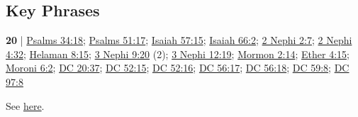 		
		
\subsection{Key Phrases} %
	\label{SPIRIT-PHRASES}

	\begin{compactdesc}
	
		\item[contrite spirit] \textbf{20} | \hyperref[PSALMS-34-18]{Psalms 34:18}; \hyperref[PSALMS-51-17]{Psalms 51:17}; \hyperref[ISAIAH-57-15]{Isaiah 57:15}; \hyperref[ISAIAH-66-2]{Isaiah 66:2}; \hyperref[2NEPHI-2-7]{2 Nephi 2:7}; \hyperref[2NEPHI-4-32]{2 Nephi 4:32}; \hyperref[HELAMAN-8-15]{Helaman 8:15}; \hyperref[3NEPHI-9-20]{3 Nephi 9:20} (2); \hyperref[3NEPHI-12-19]{3 Nephi 12:19}; \hyperref[MORMON-2-14]{Mormon 2:14}; \hyperref[ETHER-4-15]{Ether 4:15}; \hyperref[MORONI-6-2]{Moroni 6:2}; \hyperref[DC20-37]{DC 20:37}; \hyperref[DC52-15]{DC 52:15}; \hyperref[DC52-16]{DC 52:16}; \hyperref[DC56-17]{DC 56:17}; \hyperref[DC56-18]{DC 56:18}; \hyperref[DC59-8]{DC 59:8}; \hyperref[DC97-8]{DC 97:8}
			\begin{compactdesc}
				\item[Bible anchor verses] \phantom{.}
					\begin{compactdesc}
						\item[{\hyperref[PSALMS-34-18]{Psalms 34:18}}]
						\item[{\hyperref[PSALMS-51-17]{Psalms 51:17}}]
						\item[{\hyperref[ISAIAH-57-15]{Isaiah 57:15}}]
						\item[{\hyperref[ISAIAH-66-2]{Isaiah 66:2}}]
					\end{compactdesc}
			\end{compactdesc}
	
		\item[power of * spirit] See \hyperref[POWER-PHRASES]{here}.
		

\end{compactdesc}
